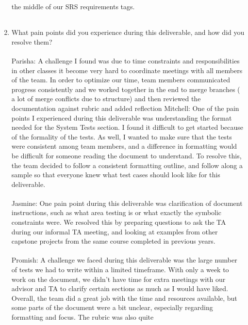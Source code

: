\documentclass[12pt, titlepage]{article}
\begin{document}
\begin{enumerate}
  the middle of our SRS requirements tags.\\\\
  \item What pain points did you experience during this deliverable, and how
    did you resolve them?\\\\
  \newline
  \hspace{2em} Parisha: A challenge I found was due to time constraints and responsibilities
   in other classes it become very hard to coordinate meetings with all members of the team. 
   In order to optimize our time, team members communicated progress consistently and we worked together
    in the end to merge branches ( a lot of merge conflicts due to structure) and then reviewed the documentation
    against rubric and added reflection
  \hspace{2em} Mitchell: One of the pain points I experienced during this deliverable was understanding the
  format needed for the System Tests section. I found it difficult to get started because of the formality
  of the tests. As well, I wanted to make sure that the tests were consistent among team members, and a difference
  in formatting would be difficult for someone reading the document to understand. To resolve this, the team decided
  to follow a consistent formatting outline, and follow along a sample so that everyone knew what test cases
  should look like for this deliverable.\\\\
  \hspace{2em} Jasmine: One pain point during this deliverable was clarification of document instructions, 
  such as what area testing is or what exactly the symbolic constraints were. We resolved this by preparing 
  questions to ask the TA during our informal TA meeting, and looking at examples from other capstone projects 
  from the same course completed in previous years.\\\\
  \hspace{2em} Promish: A challenge we faced during this deliverable was the 
  large number of tests we had to write within a limited timeframe. With only a week 
  to work on the document, we didn’t have time for extra meetings with our advisor and 
  TA to clarify certain sections as much as I would have liked. Overall, the team did a 
  great job with the time and resources available, but some parts of the document were a 
  bit unclear, especially regarding formatting and focus. The rubric was also quite 

\end{enumerate}
\end{document}

